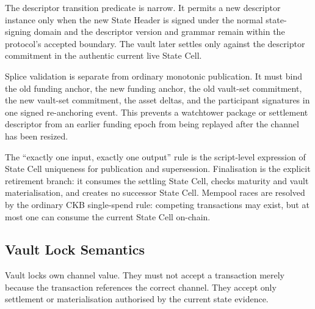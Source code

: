 \documentclass[a4paper,11pt]{article}
\begin{document}
The descriptor transition predicate is narrow. It permits a new
descriptor instance only when the new State Header is signed under the normal
state-signing domain and the descriptor version and grammar remain within the
protocol's accepted boundary. The vault later settles only against the
descriptor commitment in the authentic current live State Cell.

Splice validation is separate from ordinary monotonic publication. It must bind
the old funding anchor, the new funding anchor, the old vault-set commitment,
the new vault-set commitment, the asset deltas, and the participant signatures
in one signed re-anchoring event. This prevents a watchtower package or
settlement descriptor from an earlier funding epoch from being replayed after
the channel has been resized.

The ``exactly one input, exactly one output'' rule is the script-level
expression of State Cell uniqueness for publication and supersession.
Finalisation is the explicit retirement branch: it consumes the settling State
Cell, checks maturity and vault materialisation, and creates no successor State
Cell. Mempool races are resolved by the ordinary CKB single-spend rule:
competing transactions may exist, but at most one can consume the current State
Cell on-chain.

\subsection{Vault Lock Semantics}

Vault locks own channel value. They must not accept a transaction merely because the transaction references the correct channel. They accept only settlement or materialisation authorised by the current state evidence.
\end{document}
